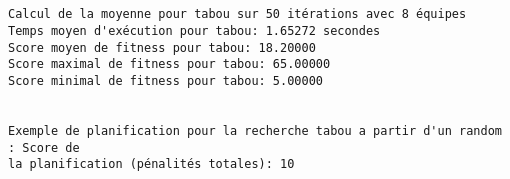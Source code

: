 \documentclass[11pt]{article}
\begin{document}
    \begin{Verbatim}[commandchars=\\\{\}]


Calcul de la moyenne pour tabou sur 50 itérations avec 8 équipes
Temps moyen d'exécution pour tabou: 1.65272 secondes
Score moyen de fitness pour tabou: 18.20000
Score maximal de fitness pour tabou: 65.00000
Score minimal de fitness pour tabou: 5.00000


Exemple de planification pour la recherche tabou a partir d'un random : Score de
la planification (pénalités totales): 10
    \end{Verbatim}

    \begin{center}
    \end{center}
    { \hspace*{\fill} \\}
    
    \begin{center}
    \end{center}
    { \hspace*{\fill} \\}
    
\end{document}
